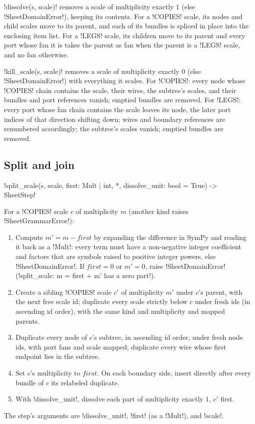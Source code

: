 \py!dissolve(s, scale)! removes a scale of multiplicity exactly $1$ (else \py!SheetDomainError!),
keeping its contents. For a \code!COPIES! scale, its nodes and child scales move to its parent,
and each of its bundles is spliced in place into the enclosing item list. For a \code!LEGS! scale,
its children move to its parent and every port whose fan it is takes the parent as fan when the
parent is a \code!LEGS! scale, and no fan otherwise.

\py!kill_scale(s, scale)! removes a scale of multiplicity exactly $0$ (else
\py!SheetDomainError!) with everything it scales. For \code!COPIES!: every node whose
\code!COPIES! chain contains the scale, their wires, the subtree's scales, and their bundles and
port references vanish; emptied bundles are removed. For \code!LEGS!: every port whose fan chain
contains the scale leaves its node, the later port indices of that direction shifting down; wires
and boundary references are renumbered accordingly; the subtree's scales vanish; emptied bundles
are removed.

\subsection{Split and join}

\begin{signature}
\py!split_scale(s, scale, first: Mult | int, *, dissolve_unit: bool = True) -> SheetStep!
\end{signature}
\begin{algorithm}[Divider]\label{alg:rewriting-split}
For a \code!COPIES! scale $c$ of multiplicity $m$ (another kind raises \py!SheetGrammarError!):
\begin{enumerate}
\item Compute $m' = m - \mathit{first}$ by expanding the difference in SymPy and reading it back as
  a \py!Mult!: every term must have a non-negative integer coefficient and factors that are symbols
  raised to positive integer powers, else \py!SheetDomainError!. If $\mathit{first} = 0$ or
  $m' = 0$, raise \py!SheetDomainError! (\code!split_scale: m = first + m' has a zero part!).
\item Create a sibling \code!COPIES! scale $c'$ of multiplicity $m'$ under $c$'s parent, with the
  next free scale id; duplicate every scale strictly below $c$ under fresh ids (in ascending id
  order), with the same kind and multiplicity and mapped parents.
\item Duplicate every node of $c$'s subtree, in ascending id order, under fresh node ids, with port
  fans and scale mapped; duplicate every wire whose first endpoint lies in the subtree.
\item Set $c$'s multiplicity to $\mathit{first}$. On each boundary side, insert directly after every
  bundle of $c$ its relabeled duplicate.
\item With \py!dissolve_unit!, dissolve each part of multiplicity exactly $1$, $c'$ first.
\end{enumerate}
\end{algorithm}
The step's arguments are \code!dissolve_unit!, \code!first! (as a \py!Mult!), and \code!scale!.

